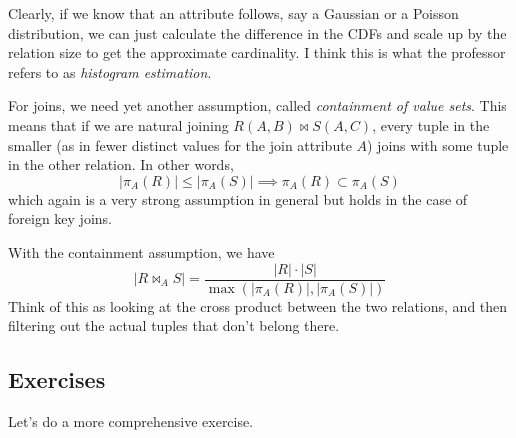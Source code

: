     Clearly, if we know that an attribute follows, say a Gaussian or a Poisson distribution, we can just calculate the difference in the CDFs and scale up by the relation size to get the approximate cardinality. I think this is what the professor refers to as \textit{histogram estimation}. 

    For joins, we need yet another assumption, called \textit{containment of value sets}. This means that if we are natural joining $R(A, B) \bowtie S(A, C)$, every tuple in the smaller (as in fewer distinct values for the join attribute $A$) joins with some tuple in the other relation. In other words, 
    \begin{equation}
      |\pi_A (R)| \leq |\pi_A (S)| \implies \pi_A (R) \subset \pi_A (S)
    \end{equation}
    which again is a very strong assumption in general but holds in the case of foreign key joins. 

    \begin{example} 
      With the containment assumption, we have 
      \begin{equation}
        |R \bowtie_{A} S| = \frac{|R| \cdot |S|}{\max( |\pi_A (R)|, |\pi_A(S)|)}
      \end{equation} 
      Think of this as looking at the cross product between the two relations, and then filtering out the actual tuples that don't belong there.  
    \end{example}

\subsection{Exercises} 

  Let's do a more comprehensive exercise. 

